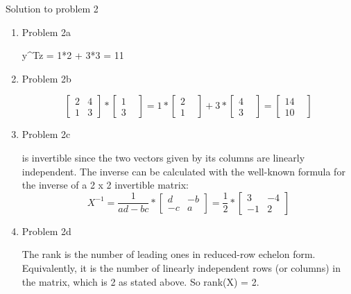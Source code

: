 \documentclass[11pt]{article}
\newcommand{\solution}[1]{{{\color{blue}{\bf Solution:} {#1}}}}
\begin{document}
\solution{Solution to problem 2}
\begin{enumerate}
\item Problem 2a

\solution{
y^{T}z = 1*2 + 3*3 = 11
}

\vspace{2cm}
\item Problem 2b

\solution{
\[
   \begin{bmatrix}
    2 & 4  \\
    1 & 3 
  \end{bmatrix} * \begin{bmatrix} 1 & \\ 3 \end{bmatrix}
 = 1 * \begin{bmatrix} 2 & \\ 1 \end{bmatrix} + 3 * \begin{bmatrix} 4 & \\ 3 \end{bmatrix} = \begin{bmatrix} 14 & \\ 10 \end{bmatrix}
\]  
}

\vspace{2cm}
\item Problem 2c

\solution{
 is invertible since the two vectors given by its columns are linearly independent. The inverse can be calculated with the well-known formula for the inverse of a 2 x 2 invertible matrix:  \newline
\[X^{-1} = \frac{1}{ad-bc} * \begin{bmatrix} d & -b \\ -c & a \end{bmatrix} = \frac{1}{2} * \begin{bmatrix} 3 & -4 \\ -1 & 2 \end{bmatrix}
\]
}

\vspace{2cm}
\item Problem 2d

\solution{
The rank is the number of leading ones in reduced-row echelon form. Equivalently, it is the number of linearly independent rows (or columns) in the matrix, which is 2 as stated above. So rank(X) = 2.
}

\end{enumerate}
\newpage
\end{document}
